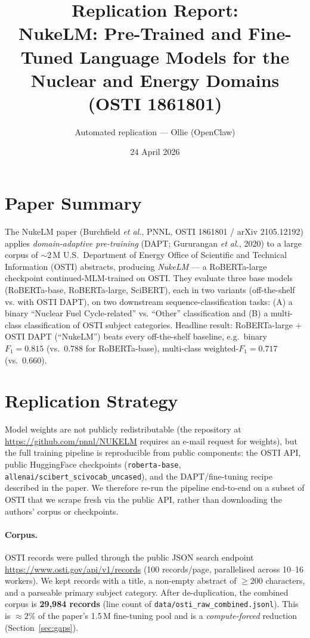 \documentclass[11pt]{article}
\title{Replication Report:\\ \textbf{NukeLM: Pre-Trained and Fine-Tuned Language Models for the Nuclear and Energy Domains} (OSTI 1861801)}
\author{Automated replication --- Ollie (OpenClaw)}
\date{24 April 2026}
\begin{document}
\maketitle

\section{Paper Summary}

The NukeLM paper (Burchfield \emph{et al.}, PNNL, OSTI 1861801 / arXiv 2105.12192) applies \emph{domain-adaptive pre-training} (DAPT; Gururangan \emph{et al.}, 2020) to a large corpus of $\sim$2\,M U.S.\ Department of Energy Office of Scientific and Technical Information (OSTI) abstracts, producing \emph{NukeLM} — a RoBERTa-large checkpoint continued-MLM-trained on OSTI. They evaluate three base models (RoBERTa-base, RoBERTa-large, SciBERT), each in two variants (off-the-shelf vs. with OSTI DAPT), on two downstream sequence-classification tasks: (A) a binary ``Nuclear Fuel Cycle-related'' vs. ``Other'' classification and (B) a multi-class classification of OSTI subject categories. Headline result: RoBERTa-large + OSTI DAPT (``NukeLM'') beats every off-the-shelf baseline, e.g.\ binary $F_1 = 0.815$ (vs.\ 0.788 for RoBERTa-base), multi-class weighted-$F_1 = 0.717$ (vs.\ 0.660).

\section{Replication Strategy}

Model weights are not publicly redistributable (the repository at \url{https://github.com/pnnl/NUKELM} requires an e-mail request for weights), but the full training pipeline is reproducible from public components: the OSTI API, public HuggingFace checkpoints (\texttt{roberta-base}, \texttt{allenai/scibert\_scivocab\_uncased}), and the DAPT/fine-tuning recipe described in the paper. We therefore re-run the pipeline end-to-end on a subset of OSTI that we scrape fresh via the public API, rather than downloading the authors' corpus or checkpoints.

\paragraph{Corpus.} OSTI records were pulled through the public JSON search endpoint \url{https://www.osti.gov/api/v1/records} (100 records/page, parallelised across 10--16 workers). We kept records with a title, a non-empty abstract of $\ge 200$ characters, and a parseable primary subject category. After de-duplication, the combined corpus is \textbf{29{,}984 records} (line count of \texttt{data/osti\_raw\_combined.jsonl}). This is $\approx 2\%$ of the paper's 1.5\,M fine-tuning pool and is a \emph{compute-forced} reduction (Section~\ref{sec:gaps}).
\end{document}
